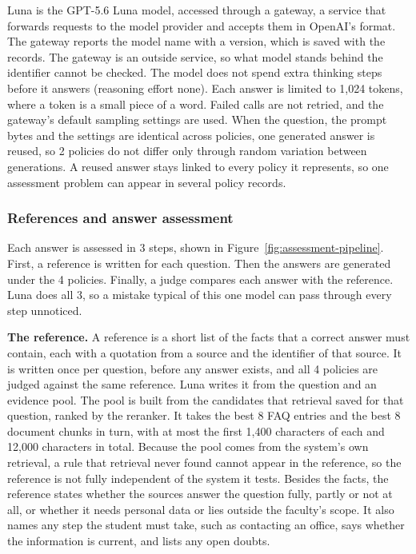 Luna is the GPT-5.6 Luna model, accessed through a gateway, a service that forwards requests to the model provider and accepts them in OpenAI's format. The gateway reports the model name with a version, which is saved with the records. The gateway is an outside service, so what model stands behind the identifier cannot be checked. The model does not spend extra thinking steps before it answers (reasoning effort none). Each answer is limited to 1,024 tokens, where a token is a small piece of a word. Failed calls are not retried, and the gateway's default sampling settings are used. When the question, the prompt bytes and the settings are identical across policies, one generated answer is reused, so 2 policies do not differ only through random variation between generations. A reused answer stays linked to every policy it represents, so one assessment problem can appear in several policy records.

\subsubsection{References and answer assessment}

Each answer is assessed in 3 steps, shown in Figure~\ref{fig:assessment-pipeline}. First, a reference is written for each question. Then the answers are generated under the 4 policies. Finally, a judge compares each answer with the reference. Luna does all 3, so a mistake typical of this one model can pass through every step unnoticed.



\textbf{The reference.} A reference is a short list of the facts that a correct answer must contain, each with a quotation from a source and the identifier of that source. It is written once per question, before any answer exists, and all 4 policies are judged against the same reference. Luna writes it from the question and an evidence pool. The pool is built from the candidates that retrieval saved for that question, ranked by the reranker. It takes the best 8 FAQ entries and the best 8 document chunks in turn, with at most the first 1,400 characters of each and 12,000 characters in total. Because the pool comes from the system's own retrieval, a rule that retrieval never found cannot appear in the reference, so the reference is not fully independent of the system it tests. Besides the facts, the reference states whether the sources answer the question fully, partly or not at all, or whether it needs personal data or lies outside the faculty's scope. It also names any step the student must take, such as contacting an office, says whether the information is current, and lists any open doubts.

